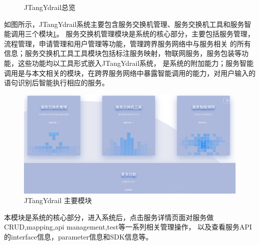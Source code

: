 \begin{figure}[htbp]
  \caption{JTangYdrail总览}
  \end{figure}
  如图所示，JTangYdrail系统主要包含服务交换机管理、服务交换机工具和服务智能调用三个模块\ref{fig:sangemokuai}。
  服务交换机管理模块是系统的核心部分，主要包括服务管理，流程管理，申请管理和用户管理等功能，管理跨界服务网络中与服务相关
  的所有信息；服务交换机工具工具模块包括标注服务映射，物联网服务，服务包装等功能，这些功能均以工具形式嵌入JTangYdrail系统，
  是系统的附加能力；服务智能调用是与本文相关的模块，在跨界服务网络中暴露智能调用的能力，对用户输入的语句识别后智能执行相应的服务。

  \begin{figure}[htbp]
    \centering
    \includegraphics[width=17cm]{./images/sangemokuai.png}
    \caption{JTangYdrail 主要模块}
    \label{fig:sangemokuai}
  \end{figure}

本模块是系统的核心部分，进入系统后，点击服务详情页面对服务做CRUD,mapping,api management,test等一系列相关管理操作，
以及查看服务API的interface信息，parameter信息和SDK信息等。

